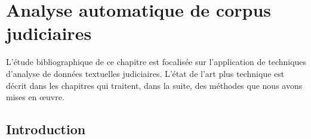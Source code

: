 \chapter{Analyse automatique de corpus judiciaires}
\label{chap:literature}


L'étude bibliographique de ce chapitre est focalisée sur l'application de techniques d'analyse de données textuelles judiciaires. L'état de l'art plus technique est décrit dans les chapitres qui traitent, dans la suite, des méthodes que nous avons mises en \oe{}uvre.

\section{Introduction}

